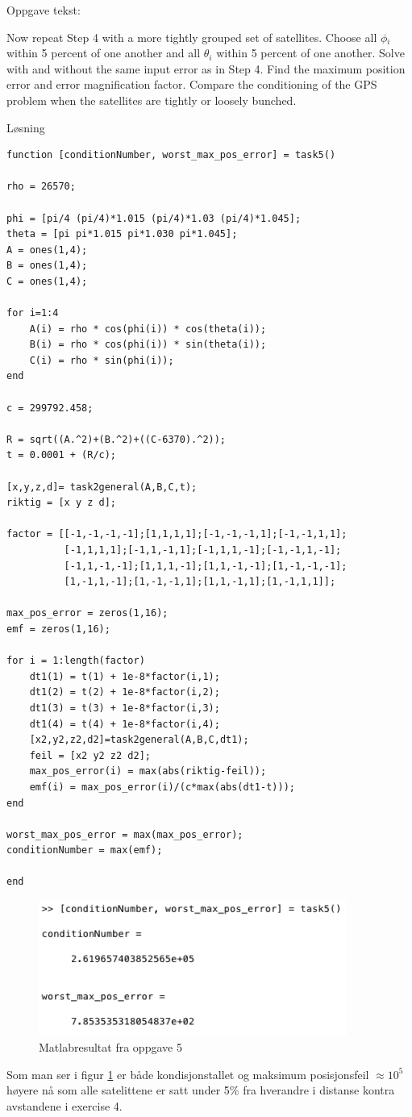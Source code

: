 \documentclass{article}
\begin{document}

Oppgave tekst: 

Now repeat Step 4 with a more tightly grouped set of satellites. Choose all $\phi$$_i$ within
5 percent of one another and all $\theta$$_i$ within 5 percent of one another. Solve with and without the same input error as in Step 4. Find the maximum position error and error magnification factor. Compare the conditioning of the GPS problem when the satellites are tightly or loosely bunched.

\vspace{5mm}
Løsning

\begin{lstlisting}[caption={Task3.m}]
function [conditionNumber, worst_max_pos_error] = task5()

rho = 26570;

phi = [pi/4 (pi/4)*1.015 (pi/4)*1.03 (pi/4)*1.045];
theta = [pi pi*1.015 pi*1.030 pi*1.045];
A = ones(1,4); 
B = ones(1,4); 
C = ones(1,4);

for i=1:4
    A(i) = rho * cos(phi(i)) * cos(theta(i));
    B(i) = rho * cos(phi(i)) * sin(theta(i));
    C(i) = rho * sin(phi(i));
end

c = 299792.458;

R = sqrt((A.^2)+(B.^2)+((C-6370).^2));
t = 0.0001 + (R/c);

[x,y,z,d]= task2general(A,B,C,t); 
riktig = [x y z d];

factor = [[-1,-1,-1,-1];[1,1,1,1];[-1,-1,-1,1];[-1,-1,1,1];
		  [-1,1,1,1];[-1,1,-1,1];[-1,1,1,-1];[-1,-1,1,-1];
		  [-1,1,-1,-1];[1,1,1,-1];[1,1,-1,-1];[1,-1,-1,-1];
		  [1,-1,1,-1];[1,-1,-1,1];[1,1,-1,1];[1,-1,1,1]];

max_pos_error = zeros(1,16);
emf = zeros(1,16);

for i = 1:length(factor)
    dt1(1) = t(1) + 1e-8*factor(i,1);
    dt1(2) = t(2) + 1e-8*factor(i,2);
    dt1(3) = t(3) + 1e-8*factor(i,3);
    dt1(4) = t(4) + 1e-8*factor(i,4); 
    [x2,y2,z2,d2]=task2general(A,B,C,dt1);
    feil = [x2 y2 z2 d2];
    max_pos_error(i) = max(abs(riktig-feil));
    emf(i) = max_pos_error(i)/(c*max(abs(dt1-t)));
end

worst_max_pos_error = max(max_pos_error);
conditionNumber = max(emf);

end
\end{lstlisting}

\begin{figure}[h]
    \centering
    \includegraphics[width=0.9\textwidth]{task5result}
    \caption{Matlabresultat fra oppgave 5}
    \label{fig:task5result}
\end{figure}

Som man ser i figur \ref{fig:task5result} er både kondisjonstallet og maksimum posisjonsfeil $\approx10^5$ høyere nå som alle satelittene er satt under 5\% fra hverandre i distanse kontra avstandene i exercise 4.

\end{document}
